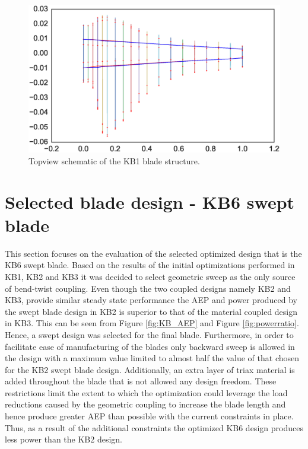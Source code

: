 \begin{figure}[!ht]
\begin{center}
	\includegraphics[width=.85\linewidth]{figures/KB1_topview.eps}
\end{center}
\caption{Topview schematic of the KB1 blade structure.}
\label{fig:topview}
\end{figure}

\section{Selected blade design - KB6 swept blade}
\label{sec:final_design}
This section focuses on the evaluation of the selected optimized design that is the KB6 swept blade. Based on the results of the initial optimizations performed in KB1, KB2 and KB3 it was decided to select geometric sweep as the only source of bend-twist coupling. Even though the two coupled designs namely KB2 and KB3, provide similar steady state performance the AEP and power produced by the swept blade design in KB2 is superior to that of the material coupled design in KB3. This can be seen from Figure \ref{fig:KB_AEP} and Figure \ref{fig:powerratio}. Hence, a swept design was selected for the final blade. Furthermore, in order to facilitate ease of manufacturing of the blades only backward sweep is allowed in the design with a maximum value limited to almost half the value of that chosen for the KB2 swept blade design. Additionally, an extra layer of triax material is added throughout the blade that is not allowed any design freedom. These restrictions limit the extent to which the optimization could leverage the load reductions caused by the geometric coupling to increase the blade length and hence produce greater AEP than possible with the current constraints in place. Thus, as a result of the additional constraints the optimized KB6 design produces less power than the KB2 design.

